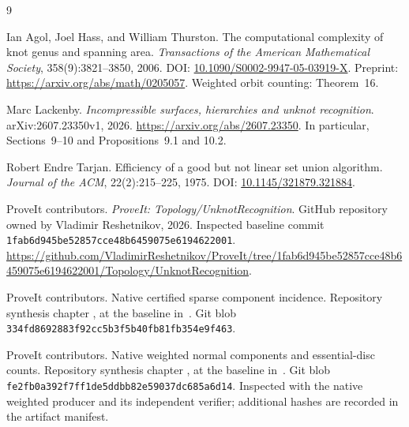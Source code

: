 \begin{thebibliography}{9}
\raggedright
{}
Ian Agol, Joel Hass, and William Thurston.
\newblock The computational complexity of knot genus and spanning area.
\newblock \emph{Transactions of the American Mathematical Society},
358(9):3821--3850, 2006.
\newblock DOI: \href{https://doi.org/10.1090/S0002-9947-05-03919-X}{10.1090/S0002-9947-05-03919-X}.
\newblock Preprint: \url{https://arxiv.org/abs/math/0205057}.
\newblock Weighted orbit counting: Theorem~16.

Marc Lackenby.
\newblock \emph{Incompressible surfaces, hierarchies and unknot recognition}.
\newblock arXiv:2607.23350v1, 2026.
\newblock \url{https://arxiv.org/abs/2607.23350}.
\newblock In particular, Sections~9--10 and Propositions~9.1 and 10.2.

Robert Endre Tarjan.
\newblock Efficiency of a good but not linear set union algorithm.
\newblock \emph{Journal of the ACM}, 22(2):215--225, 1975.
\newblock DOI: \href{https://doi.org/10.1145/321879.321884}{10.1145/321879.321884}.

ProveIt contributors.
\newblock \emph{ProveIt: Topology/UnknotRecognition}.
\newblock GitHub repository owned by Vladimir Reshetnikov, 2026.
\newblock Inspected baseline commit
\nolinkurl{1fab6d945be52857cce48b6459075e6194622001}.
\newblock \url{https://github.com/VladimirReshetnikov/ProveIt/tree/1fab6d945be52857cce48b6459075e6194622001/Topology/UnknotRecognition}.

ProveIt contributors.
\newblock Native certified sparse component incidence.
\newblock Repository synthesis chapter ,
at the baseline in~\cite{repo}.
\newblock Git blob \texttt{334fd8692883f92cc5b3f5b40fb81fb354e9f463}.

ProveIt contributors.
\newblock Native weighted normal components and essential-disc counts.
\newblock Repository synthesis chapter ,
at the baseline in~\cite{repo}.
\newblock Git blob \texttt{fe2fb0a392f7ff1de5ddbb82e59037dc685a6d14}.
\newblock Inspected with the native weighted producer and its independent verifier;
additional hashes are recorded in the artifact manifest.
\end{thebibliography}

